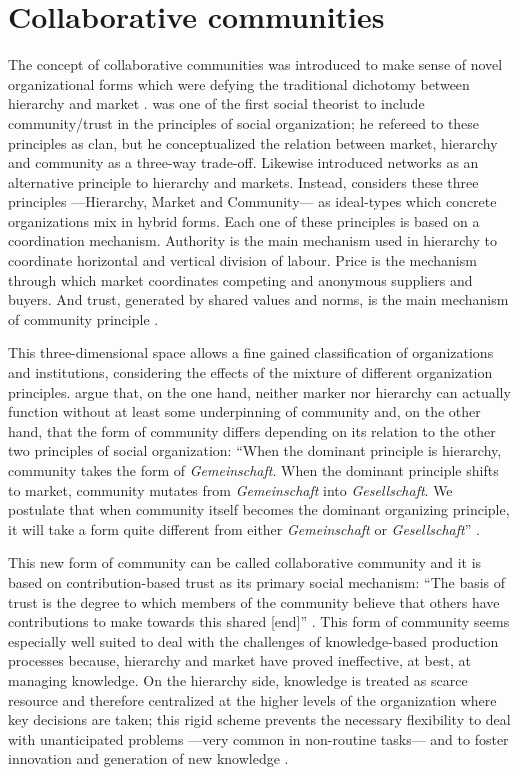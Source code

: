 \section{Collaborative communities}

The concept of collaborative communities was introduced to make sense of novel organizational forms which were defying the traditional dichotomy between hierarchy and market \citep{coase:1937,williamson:1975}. \citet{ouchi:1980} was one of the first social theorist to include community/trust in the principles of social organization; he refereed to these principles as clan, but he conceptualized the relation between market, hierarchy and community as a three-way trade-off. Likewise \citet{powell:1990} introduced networks as an alternative principle to hierarchy and markets. Instead, \citet{adler:2001} considers these three principles ---Hierarchy, Market and Community--- as ideal-types which concrete organizations mix in hybrid forms.  Each one of these principles is based on a coordination mechanism. Authority is the main mechanism used in hierarchy to coordinate horizontal and vertical division of labour. Price is the mechanism through which market coordinates competing and anonymous suppliers and buyers. And trust, generated by shared values and norms, is the main mechanism of community principle \citep{adler:2001}.

This three-dimensional space allows a fine gained classification of organizations and institutions, considering the effects of the mixture of different organization principles. \citet{adler:2006} argue that, on the one hand, neither marker nor hierarchy can actually function without at least some underpinning of community and, on the other hand, that the form of community differs depending on its relation to the other two principles of social organization: ``When the dominant principle is hierarchy, community takes the form of \emph{Gemeinschaft}. When the dominant principle shifts to market, community mutates from \emph{Gemeinschaft} into \emph{Gesellschaft}. We postulate that when community itself becomes the dominant organizing principle, it will take a form quite different from either \emph{Gemeinschaft} or \emph{Gesellschaft}'' \citep[16]{adler:2006}.

This new form of community can be called collaborative community and it is based on contribution-based trust as its primary social mechanism: ``The basis of trust is the degree to which members of the community believe that others have contributions to make towards this shared [end]'' \citep[21]{adler:2006}. This form of community seems especially well suited to deal with the challenges of knowledge-based production processes because, hierarchy and market have proved ineffective, at best, at managing knowledge. On the hierarchy side, knowledge is treated as scarce resource and therefore centralized at the higher levels of the organization where key decisions are taken; this rigid scheme prevents the necessary flexibility to deal with unanticipated problems ---very common in non-routine tasks--- and to foster innovation and generation of new knowledge \citep[216]{adler:2001}. 

